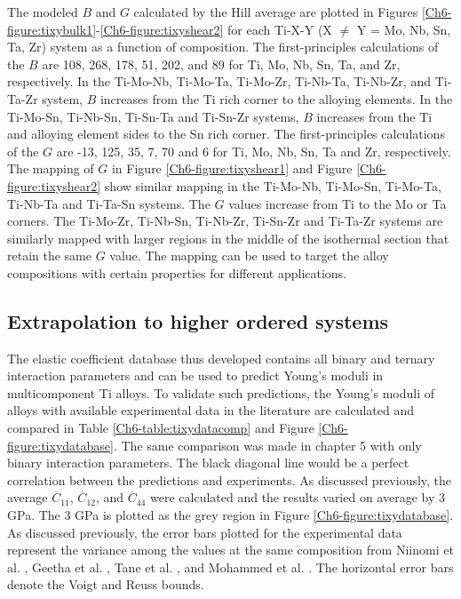 The modeled $B$ and $G$ calculated by the Hill average are plotted in Figures \ref{Ch6-figure:tixybulk1}-\ref{Ch6-figure:tixyshear2} for each Ti-X-Y (X $\neq$ Y = Mo, Nb, Sn, Ta, Zr) system as a function of composition. The first-principles calculations of the $B$ are 108, 268, 178, 51, 202, and 89 for Ti, Mo, Nb, Sn, Ta, and Zr, respectively. In the Ti-Mo-Nb, Ti-Mo-Ta, Ti-Mo-Zr, Ti-Nb-Ta, Ti-Nb-Zr, and Ti-Ta-Zr system, $B$ increases from the Ti rich corner to the alloying elements. In the Ti-Mo-Sn, Ti-Nb-Sn, Ti-Sn-Ta and Ti-Sn-Zr systems, $B$ increases from the Ti and alloying element sides to the Sn rich corner. The first-principles calculations of the $G$ are -13, 125, 35, 7, 70 and 6 for Ti, Mo, Nb, Sn, Ta and Zr, respectively. The mapping of $G$ in Figure \ref{Ch6-figure:tixyshear1} and Figure \ref{Ch6-figure:tixyshear2} show similar mapping in the Ti-Mo-Nb, Ti-Mo-Sn, Ti-Mo-Ta, Ti-Nb-Ta and Ti-Ta-Sn systems. The $G$ values increase from Ti to the Mo or Ta corners. The Ti-Mo-Zr, Ti-Nb-Sn, Ti-Nb-Zr, Ti-Sn-Zr and Ti-Ta-Zr systems are similarly mapped with larger regions in the middle of the isothermal section that retain the same $G$ value. The mapping can be used to target the alloy compositions with certain properties for different applications. 

\subsection{Extrapolation to higher ordered systems}

The elastic coefficient database thus developed contains all binary and ternary interaction parameters and can be used to predict Young's moduli in multicomponent Ti alloys.  To validate such predictions, the Young's moduli of alloys with available experimental data in the literature \cite{Tane2010a,Mohammed2014,Geetha2009} are calculated and compared in Table \ref{Ch6-table:tixydatacomp} and Figure \ref{Ch6-figure:tixydatabase}. The same comparison was made in chapter 5 with only binary interaction parameters. The black diagonal line would be a perfect correlation between the predictions and experiments. As discussed previously, the average $\overline{C}_{11}$, $\overline{C}_{12}$, and $\overline{C}_{44}$ were calculated and the results varied on average by 3 GPa. The 3 GPa is plotted as the grey region in Figure \ref{Ch6-figure:tixydatabase}. As discussed previously, the error bars plotted for the experimental data represent the variance among the values at the same composition from Niinomi et al. \cite{Niinomi2012}, Geetha et al. \cite{Geetha2009}, Tane et al. \cite{Tane2010a}, and Mohammed et al. \cite{Mohammed2014}. The horizontal error bars denote the Voigt and Reuss bounds.

